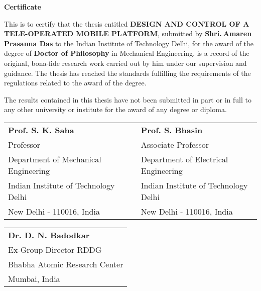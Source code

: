 \doublespacing
\newpage
\thispagestyle{empty}
\mbox{}
\newpage
\thispagestyle{empty}
\begin{center}
\textbf{\Large{Certificate}}
\end{center}

This is to certify that the thesis entitled \textbf{DESIGN AND CONTROL OF A TELE-OPERATED MOBILE PLATFORM}, submitted by   \textbf{Shri.$~$Amaren Prasanna Das} to the Indian Institute of Technology Delhi, for the award of the degree of \textbf{Doctor of Philosophy} in Mechanical Engineering, is a record of the original, bona-fide research work carried out by him under our supervision and guidance. The thesis has reached the standards fulfilling the requirements of the regulations related to the award of the degree.

The results contained in this thesis have not been submitted in part or in full to any other university or institute for the award of any degree or diploma.
\bigskip
\bigskip
\bigskip
\bigskip
\bigskip

\begin{tabular}{l l l}
\textbf{Prof. S. K. Saha} &  & \textbf{Prof. S. Bhasin}\\
Professor & &Associate Professor\\
Department of Mechanical Engineering &  & Department of Electrical Engineering\\
Indian Institute of Technology Delhi &  & Indian Institute of Technology Delhi\\
New Delhi - 110016, India & \quad \quad \quad & New Delhi - 110016, India
\end{tabular}
\bigskip
\bigskip
\bigskip
\bigskip
\bigskip

\begin{tabular}{l}
\textbf{Dr. D. N. Badodkar}\\
Ex-Group Director RDDG\\
Bhabha Atomic Research Center\\
Mumbai, India\\
\end{tabular}












\restoregeometry